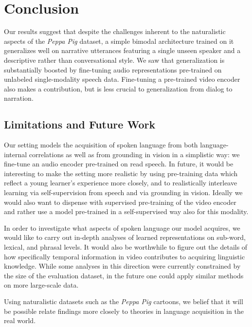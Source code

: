 \section{Conclusion}
\label{sec:conclusion}
Our results suggest that despite the challenges inherent to the
naturalistic aspects of the \emph{Peppa Pig} dataset, a simple bimodal
architecture trained on it generalizes well on narrative utterances
featuring a single unseen speaker and a descriptive rather than
conversational style. We saw that generalization is substantially
boosted by fine-tuning audio representations pre-trained on unlabeled
single-modality speech data. Fine-tuning a pre-trained video encoder
also makes a contribution, but is less crucial to generalization from
dialog to narration.


\subsection{Limitations and Future Work}
\label{sec:limitations}
Our setting models the acquisition of spoken language from both
language-internal correlations as well as from grounding in vision in
a simplistic way: we fine-tune an audio encoder pre-trained on read
speech.
In future, it would be interesting to make the setting
more realistic by using pre-training data which reflect a young
learner's experience more closely, and to realistically interleave learning via
self-supervision from speech and via grounding in vision.
Ideally we would also want to dispense with
supervised pre-training of the video encoder and rather use a model pre-trained in a
self-supervised way also for this modality.

In order to investigate what aspects of spoken language our model
acquires, we would like to carry out in-depth analyses of learned 
representations on sub-word, lexical, and phrasal levels. It would also be 
worthwhile to figure out the details of how specifically temporal information 
in video contributes to acquiring linguistic knowledge. While some analyses in 
this direction were currently constrained by the size of the evaluation 
dataset, in the future one could apply similar methods on more large-scale data.

Using naturalistic datasets such as the \textit{Peppa Pig} cartoons, we belief 
that it will be possible relate findings more closely to theories in 
language acquisition in the real world.



